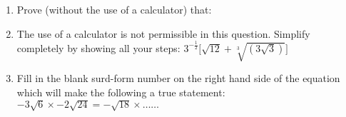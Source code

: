 \begin{eocexercises}{}
\begin{enumerate}
\item{Prove (without the use of a calculator) that:
}




\item{The use of a calculator is not permissible in this question. Simplify completely by showing all your steps: $3^{-\tfrac{1}{2}}\biggl[\sqrt{12} + \sqrt[3]{(3\sqrt{3})}\biggr]$}

\item{Fill in the blank surd-form number on the right hand side of the equation which will make the following a true statement:  $ -3\sqrt{6} \times -2\sqrt{24} = - \sqrt{18} \times \ldots \ldots $}

\end{enumerate}



\practiceinfo
\end{eocexercises} 




